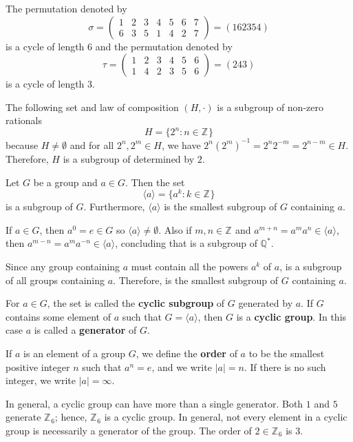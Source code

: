 \documentclass[11pt]{article} %
\newcommand\br{\vspace{15 pt}}
\newcommand\Z[1]{\text{$\mathbb{Z}^{#1}$}}
\newcommand\Q[1]{\text{$\mathbb{Q}^{#1}$}}
\newcommand\cyc[1]{\text{$\langle {#1} \rangle$}}
\newcommand\set[1]{\{#1\}}
\begin{document}
{
The permutation denoted by
$$
\sigma = \begin{pmatrix}1&2&3&4&5&6&7\\6&3&5&1&4&2&7\end{pmatrix} = (162354)
$$
is a cycle of length $6$ and the permutation denoted by
$$
\tau = \begin{pmatrix}1&2&3&4&5&6\\1&4&2&3&5&6\end{pmatrix} = (243)
$$
is a cycle of length $3$.
}

\br

{
The following set and law of composition $(H, \cdot)$ is a subgroup of non-zero rationals \Q{*}
$$
H = \set{2^{n} : n \in \Z{}}
$$
because $H \ne \emptyset$ and for all $2^n,2^m \in H$, we have $2^n (2^{m})^{-1} = 2^n 2^{-m} = 2^{n-m} \in H$. Therefore, $H$ is a subgroup of \Q{*} determined by $2$. 
}

\br

{
Let $G$ be a group and $a \in G$. Then the set
$$
\cyc{a} = \set{a^k : k \in \Z{}}
$$
is a subgroup of $G$. Furthermore, $\cyc{a}$ is the smallest subgroup of $G$ containing $a$.
}
{
If $a \in G$, then $a^0 = e \in G$ so $\cyc{a} \ne \emptyset$. Also if $m, n \in \Z{}$ and $a^{m+n}=a^m a^n \in \cyc a$, then $a^{m-n} = a^m a^{-n} \in \cyc{a}$, concluding that \cyc a is a subgroup of $\Q{*}$.

Since any group containing $a$ must contain all the powers $a^k$ of $a$, \cyc a is a subgroup of all groups containing $a$. Therefore, \cyc a is the smallest subgroup of $G$ containing $a$.
}

{
For $a \in G$, the set \cyc a is called the \textbf{cyclic subgroup} of $G$ generated by $a$. If $G$ contains some element of $a$ such that $G = \cyc a$, then $G$ is a \textbf{cyclic group}. In this case $a$ is called a \textbf{generator} of $G$.
}

\br

{
If $a$ is an element of a group $G$, we define the \textbf{order} of $a$ to be the smallest positive integer $n$ such that $a^n = e$, and we write $|a| = n$. If there is no such integer, we write $|a| = \infty$.
}

\br 
In general, a cyclic group can have more than a single generator. Both $1$ and $5$ generate $\Z{}_6$; hence, $\Z{}_6$ is a cyclic group. In general, not every element in a cyclic group is necessarily a generator of the group. The order of $2 \in \Z{}_6$ is 3.
\end{document}
